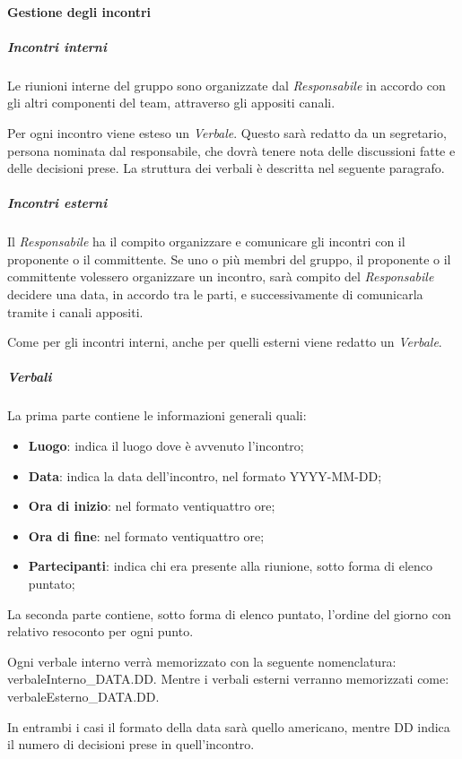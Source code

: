    			\paragraph{Gestione degli incontri}
   				\subparagraph{Incontri interni}
   					Le riunioni interne del gruppo sono organizzate dal \textit{Responsabile} in accordo con gli altri componenti del team, attraverso gli appositi canali.

   					Per ogni incontro viene esteso un \textit{Verbale}. Questo sarà redatto da un segretario, persona nominata dal responsabile, che dovrà tenere nota delle discussioni fatte e delle decisioni prese. La struttura dei verbali è descritta nel seguente paragrafo.
	   			\subparagraph{Incontri esterni}
   					Il \textit{Responsabile} ha il compito organizzare e comunicare gli incontri con il proponente o il committente. Se uno o più membri del gruppo, il proponente o il committente volessero organizzare un incontro, sarà compito del \textit{Responsabile} decidere una data, in accordo tra le parti, e successivamente di comunicarla tramite i canali appositi.

   					Come per gli incontri interni, anche per quelli esterni viene redatto un \textit{Verbale}.
   				\subparagraph{Verbali}
   					La prima parte contiene le informazioni generali quali:
   					\begin{itemize}
   						\item \textbf{Luogo}: indica il luogo dove è avvenuto l'incontro;
   						\item \textbf{Data}: indica la data dell'incontro, nel formato YYYY-MM-DD;
   						\item \textbf{Ora di inizio}: nel formato ventiquattro ore;
   						\item \textbf{Ora di fine}: nel formato ventiquattro ore;
   						\item \textbf{Partecipanti}: indica chi era presente alla riunione, sotto forma di elenco puntato;
   					\end{itemize}
   					La seconda parte contiene, sotto forma di elenco puntato, l'ordine del giorno con relativo resoconto per ogni punto.

   					Ogni verbale interno verrà memorizzato con la seguente nomenclatura: verbaleInterno\_DATA.DD.
   					Mentre i verbali esterni verranno memorizzati come: verbaleEsterno\_DATA.DD.

   					In entrambi i casi il formato della data sarà quello americano, mentre DD indica il numero di decisioni prese in quell'incontro.
